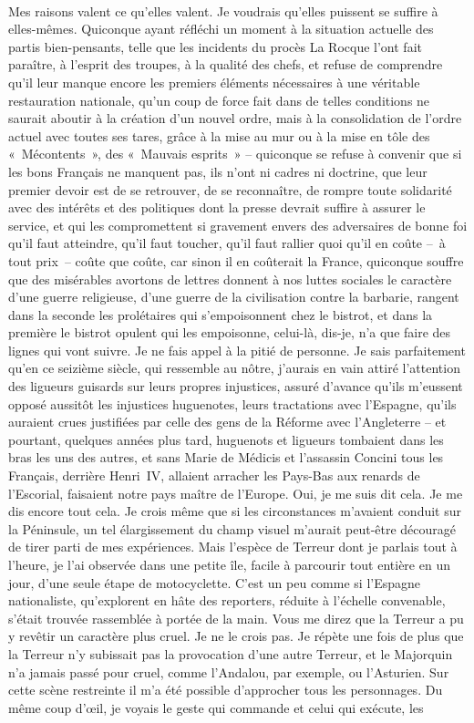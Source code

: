 \documentclass[french,twoside]{book} %
\begin{document}
\noindent  \par
Mes raisons valent ce qu’elles valent. Je voudrais qu’elles puissent se suffire à elles-mêmes. Quiconque ayant réfléchi un moment à la situation actuelle des partis bien-pensants, telle que les incidents du procès La Rocque l’ont fait paraître, à l’esprit des troupes, à la qualité des chefs, et refuse de comprendre qu’il leur manque encore les premiers éléments nécessaires à une véritable restauration nationale, qu’un coup de force fait dans de telles conditions ne saurait aboutir à la création d’un nouvel ordre, mais à la consolidation de l’ordre actuel avec toutes ses tares, grâce à la mise au mur ou à la mise en tôle des « Mécontents », des « Mauvais esprits » – quiconque se refuse à convenir que si les bons Français ne manquent pas, ils n’ont ni cadres ni doctrine, que leur premier devoir est de se retrouver, de se reconnaître, de rompre toute solidarité avec des intérêts et des politiques dont la presse devrait suffire à assurer le service, et qui les compromettent si gravement envers des adversaires de bonne foi qu’il faut atteindre, qu’il faut toucher, qu’il faut rallier quoi qu’il en coûte – à tout prix – coûte que coûte, car sinon il en coûterait la France, quiconque souffre que des misérables avortons de lettres donnent à nos luttes sociales le caractère d’une guerre religieuse, d’une guerre de la civilisation contre la barbarie, rangent dans la seconde les prolétaires qui s’empoisonnent chez le bistrot, et dans la première le bistrot opulent qui les empoisonne, celui-là, dis-je, n’a que faire des lignes qui vont suivre. Je ne fais appel à la pitié de personne. Je sais parfaitement qu’en ce seizième siècle, qui ressemble au nôtre, j’aurais en vain attiré l’attention des ligueurs guisards sur leurs propres injustices, assuré d’avance qu’ils m’eussent opposé aussitôt les injustices huguenotes, leurs tractations avec l’Espagne, qu’ils auraient crues justifiées par celle des gens de la Réforme avec l’Angleterre – et pourtant, quelques années plus tard, huguenots et ligueurs tombaient dans les bras les uns des autres, et sans Marie de Médicis et l’assassin Concini tous les Français, derrière Henri \textsc{IV}, allaient arracher les Pays-Bas aux renards de l’Escorial, faisaient notre pays maître de l’Europe. Oui, je me suis dit cela. Je me dis encore tout cela. Je crois même que si les circonstances m’avaient conduit sur la Péninsule, un tel élargissement du champ visuel m’aurait peut-être découragé de tirer parti de mes expériences. Mais l’espèce de Terreur dont je parlais tout à l’heure, je l’ai observée dans une petite île, facile à parcourir tout entière en un jour, d’une seule étape de motocyclette. C’est un peu comme si l’Espagne nationaliste, qu’explorent en hâte des reporters, réduite à l’échelle convenable, s’était trouvée rassemblée à portée de la main. Vous me direz que la Terreur a pu y revêtir un caractère plus cruel. Je ne le crois pas. Je répète une fois de plus que la Terreur n’y subissait pas la provocation d’une autre Terreur, et le Majorquin n’a jamais passé pour cruel, comme l’Andalou, par exemple, ou l’Asturien. Sur cette scène restreinte il m’a été possible d’approcher tous les personnages. Du même coup d’œil, je voyais le geste qui commande et celui qui exécute, les 
\end{document}
